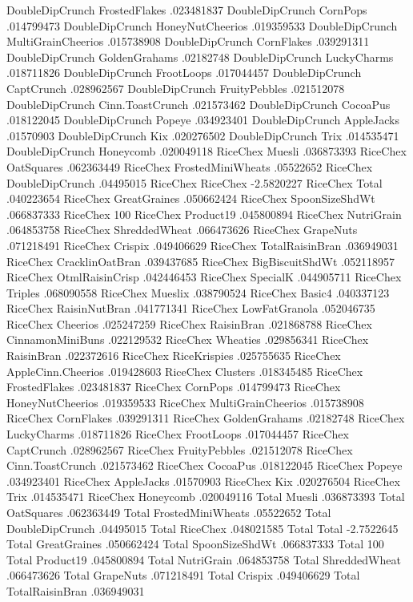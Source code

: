 DoubleDipCrunch	FrostedFlakes	.023481837
DoubleDipCrunch	CornPops	.014799473
DoubleDipCrunch	HoneyNutCheerios	.019359533
DoubleDipCrunch	MultiGrainCheerios	.015738908
DoubleDipCrunch	CornFlakes	.039291311
DoubleDipCrunch	GoldenGrahams	.02182748
DoubleDipCrunch	LuckyCharms	.018711826
DoubleDipCrunch	FrootLoops	.017044457
DoubleDipCrunch	CaptCrunch	.028962567
DoubleDipCrunch	FruityPebbles	.021512078
DoubleDipCrunch	Cinn.ToastCrunch	.021573462
DoubleDipCrunch	CocoaPus	.018122045
DoubleDipCrunch	Popeye	.034923401
DoubleDipCrunch	AppleJacks	.01570903
DoubleDipCrunch	Kix	.020276502
DoubleDipCrunch	Trix	.014535471
DoubleDipCrunch	Honeycomb	.020049118
RiceChex	Muesli	.036873393
RiceChex	OatSquares	.062363449
RiceChex	FrostedMiniWheats	.05522652
RiceChex	DoubleDipCrunch	.04495015
RiceChex	RiceChex	-2.5820227
RiceChex	Total	.040223654
RiceChex	GreatGraines	.050662424
RiceChex	SpoonSizeShdWt	.066837333
RiceChex	100%
RiceChex	Product19	.045800894
RiceChex	NutriGrain	.064853758
RiceChex	ShreddedWheat	.066473626
RiceChex	GrapeNuts	.071218491
RiceChex	Crispix	.049406629
RiceChex	TotalRaisinBran	.036949031
RiceChex	CracklinOatBran	.039437685
RiceChex	BigBiscuitShdWt	.052118957
RiceChex	OtmlRaisinCrisp	.042446453
RiceChex	SpecialK	.044905711
RiceChex	Triples	.068090558
RiceChex	Mueslix	.038790524
RiceChex	Basic4	.040337123
RiceChex	RaisinNutBran	.041771341
RiceChex	LowFatGranola	.052046735
RiceChex	Cheerios	.025247259
RiceChex	RaisinBran	.021868788
RiceChex	CinnamonMiniBuns	.022129532
RiceChex	Wheaties	.029856341
RiceChex	RaisinBran	.022372616
RiceChex	RiceKrispies	.025755635
RiceChex	AppleCinn.Cheerios	.019428603
RiceChex	Clusters	.018345485
RiceChex	FrostedFlakes	.023481837
RiceChex	CornPops	.014799473
RiceChex	HoneyNutCheerios	.019359533
RiceChex	MultiGrainCheerios	.015738908
RiceChex	CornFlakes	.039291311
RiceChex	GoldenGrahams	.02182748
RiceChex	LuckyCharms	.018711826
RiceChex	FrootLoops	.017044457
RiceChex	CaptCrunch	.028962567
RiceChex	FruityPebbles	.021512078
RiceChex	Cinn.ToastCrunch	.021573462
RiceChex	CocoaPus	.018122045
RiceChex	Popeye	.034923401
RiceChex	AppleJacks	.01570903
RiceChex	Kix	.020276504
RiceChex	Trix	.014535471
RiceChex	Honeycomb	.020049116
Total	Muesli	.036873393
Total	OatSquares	.062363449
Total	FrostedMiniWheats	.05522652
Total	DoubleDipCrunch	.04495015
Total	RiceChex	.048021585
Total	Total	-2.7522645
Total	GreatGraines	.050662424
Total	SpoonSizeShdWt	.066837333
Total	100%
Total	Product19	.045800894
Total	NutriGrain	.064853758
Total	ShreddedWheat	.066473626
Total	GrapeNuts	.071218491
Total	Crispix	.049406629
Total	TotalRaisinBran	.036949031
